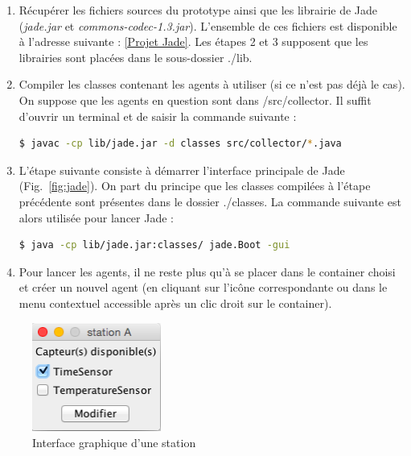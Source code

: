 \documentclass[conference]{IEEEtran}
\begin{document}
\begin{enumerate}

  \item Récupérer les fichiers sources du prototype ainsi que les librairie de Jade (\textit{jade.jar} et \textit{commons-codec-1.3.jar}). L'ensemble de ces fichiers est disponible à l'adresse suivante : \href{https://github.com/DavidLevayer/JadeProject}{[Projet Jade]}. Les étapes 2 et 3 supposent que les librairies sont placées dans le sous-dossier ./lib.\\
  
  \item Compiler les classes contenant les agents à utiliser (si ce n'est pas déjà le cas). On suppose que les agents en question sont dans /src/collector. Il suffit d'ouvrir un terminal et de saisir la commande suivante :
  \begin{lstlisting}[language=bash,frame=none]
  $ javac -cp lib/jade.jar -d classes src/collector/*.java
  \end{lstlisting}

  \item L'étape suivante consiste à démarrer l'interface principale de Jade (Fig.~\ref{fig:jade}). On part du principe que les classes compilées à l'étape précédente sont présentes dans le dossier ./classes. La commande suivante est alors utilisée pour lancer Jade :
  \begin{lstlisting}[language=bash,frame=none]
  $ java -cp lib/jade.jar:classes/ jade.Boot -gui
  \end{lstlisting}
  
  \item Pour lancer les agents, il ne reste plus qu'à se placer dans le container choisi et créer un nouvel agent (en cliquant sur l'icône correspondante ou dans le menu contextuel accessible après un clic droit sur le container).
  
\end{enumerate}

\begin{figure}[h]
\centering
\includegraphics[width=120pt]{images/station.png}
\caption{Interface graphique d'une station}
\label{fig:station}
\end{figure}
\end{document}
